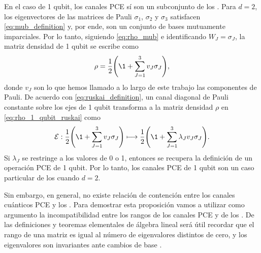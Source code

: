 En el caso de 1 qubit, los canales PCE sí son un subconjunto de los \ruskai{}. Para $d=2$,
los eigenvectores de las matrices de Pauli $\sigma_1$, $\sigma_2$ y $\sigma_3$ 
satisfacen \eqref{eq:mub_definition} y, por ende, son un conjunto 
de bases mutuamente imparciales. Por lo tanto, siguiendo \eqref{eq:rho_mub}
e identificando $W_J=\sigma_J$, la matriz densidad de 1 qubit se escribe como
\begin{align} \label{eq:rho_1_qubit_ruskai}
	\rho=\frac{1}{2}\qty(\1+\sum_{J=1}^3v_J\sigma_J),
\end{align}
donde $v_J$ son lo que hemos llamado a lo largo de este trabajo 
las componentes de Pauli.
De acuerdo con \eqref{eq:ruskai_definition}, 
un canal diagonal de Pauli constante sobre los ejes de 1 qubit transforma 
a la matriz densidad $\rho$ en \eqref{eq:rho_1_qubit_ruskai} como
\begin{align}
	\E :  \frac{1}{2}\qty(\1+\sum_{J=1}^3v_J\sigma_J)
	\longmapsto 
	\frac{1}{2}\qty(\1+\sum_{J=1}^3\lambda_J v_J\sigma_J).
\end{align}
Si $\lambda_J$ se restringe a los valores de 0 o 1, entonces se recupera 
la definición de un operación PCE de 1 qubit. Por lo tanto, los canales PCE 
de 1 qubit son un caso particular de los \ruskai{} cuando $d=2$.

Sin embargo, en general, no existe relación de contención entre los canales cuánticos PCE 
y los \ruskai{}. Para demostrar esta proposición vamos a utilizar como 
argumento la incompatibilidad entre los rangos de los canales PCE
y de los \ruskai{}. 
De las definiciones y teoremas elementales de álgebra lineal será útil 
recordar que el rango de 
una matriz es igual al número de eigenvalores distintos de cero, y los eigenvalores
son invariantes ante cambios de base \cite{axler1997linear,lang2012introduction}. 

